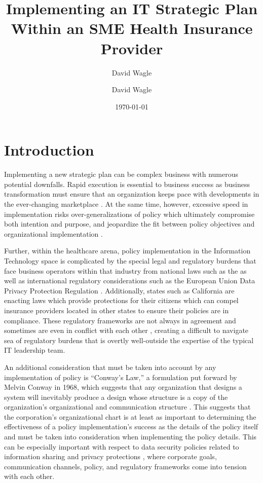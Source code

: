 \documentclass[stu]{apa7}
\author{David Wagle}
\affiliation{School of Business, Northcentral University}
\author{David Wagle}
\date{\today}
\title{Implementing an IT Strategic Plan Within an SME Health Insurance Provider}
\begin{document}
\maketitle

\section{Introduction}
\label{sec:org58d5ea3}

Implementing a new strategic plan can be complex business with numerous potential downfalls. Rapid execution is essential to business success as business transformation must ensure that an organization keeps pace with developments in the ever-changing marketplace \citep{pradhanLargeScaleQuality2021}. At the same time, however, excessive speed in implementation risks over-generalizations of policy which ultimately compromise both intention and purpose, and jeopardize the fit between policy objectives and organizational implementation \citep{ledererKeyPrescriptionsStrategic1996}.

Further, within the healthcare arena, policy implementation in the Information Technology space is complicated by the special legal and regulatory burdens that face business operators within that industry from national laws such as the \citet{HealthInsurancePortability1996} as well as international regulatory considerations such as the European Union Data Privacy Protection Regulation \citeyearpar{EuropeanUnionData}. Additionally, states such as California are enacting laws which provide protections for their citizens which can compel insurance providers located in other states to ensure their policies are in compliance. These regulatory frameworks are not always in agreement and sometimes are even in conflict with each other \citep{determannIndiaPersonalData2019,moultNavigatingConflictingLaws2016} , creating a difficult to navigate sea of regulatory burdens that is overtly well-outside the expertise of the typical IT leadership team.

An additional consideration that must be taken into account by any implementation of policy is ``Conway's Law,'' a formulation put forward by Melvin Conway in 1968, which suggests that any organization that designs a system will inevitably produce a design whose structure is a copy of the organization's organizational and communication structure \citep{conwayHOWCOMMITTEESINVENT1968}. This suggests that the corporation's organizational chart is at least as important to determining the effectiveness of a policy implementation's success as the details of the policy itself and must be taken into consideration when implementing the policy details. This can be especially important with respect to data security policies related to information sharing and privacy protections \citep{andersonInformationSecurityControl2017}, where corporate goals, communication channels, policy, and regulatory frameworks come into tension with each other.
\end{document}
